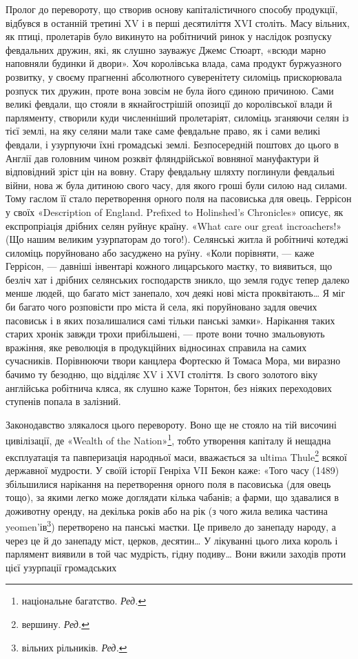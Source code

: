 Пролог до перевороту, що створив основу капіталістичного
способу продукції, відбувся в останній третині XV і в перші
десятиліття XVI століть. Масу вільних, як птиці, пролетарів
було викинуто на робітничий ринок у наслідок розпуску февдальних
дружин, які, як слушно зауважує Джемс Стюарт, «всюди
марно наповняли будинки й двори». Хоч королівська влада,
сама продукт буржуазного розвитку, у своєму прагненні абсолютного
суверенітету силоміць прискорювала розпуск тих дружин,
проте вона зовсім не була його єдиною причиною. Сами
великі февдали, що стояли в якнайгострішій опозиції до королівської
влади й парляменту, створили куди численніший пролетаріят,
силоміць зганяючи селян із тієї землі, на яку селяни
мали таке саме февдальне право, як і сами великі февдали, і
узурпуючи їхні громадські землі. Безпосередній поштовх до цього
в Англії дав головним чином розквіт фляндрійської вовняної
мануфактури й відповідний зріст цін на вовну. Стару февдальну
шляхту поглинули февдальиі війни, нова ж була дитиною свого
часу, для якого гроші були силою над силами. Тому гаслом її
стало перетворення орного поля на пасовиська для овець. Геррісон
у своїх «Description of England. Prefixed to Holinshed’s
Chronicles» описує, як експропріація дрібних селян руйнує
країну. «What care our great incroachers!» (Що нашим великим
узурпаторам до того!). Селянські житла й робітничі котеджі
силоміць поруйновано або засуджено на руїну. «Коли порівняти, —
каже Геррісон, — давніші інвентарі кожного лицарського маєтку,
то виявиться, що безліч хат і дрібних селянських господарств
зникло, що земля годує тепер далеко менше людей, що багато
міст занепало, хоч деякі нові міста проквітають\dots{} Я міг би багато
чого розповісти про міста й села, які поруйновано задля
овечих пасовиськ і в яких позалишалися самі тільки панські
замки». Нарікання таких старих хронік завжди трохи прибільшені,
— проте вони точно змальовують вражіння, яке революція
в продукційних відносинах справила на самих сучасників.
Порівнюючи твори канцлера Фортескю й Томаса Мора, ми виразно
бачимо ту безодню, що відділяє XV і XVI століття. Із свого
золотого віку англійська робітнича кляса, як слушно каже Торнтон,
без ніяких переходових ступенів попала в залізний.

Законодавство злякалося цього перевороту. Воно ще не
стояло на тій височині цивілізації, де «Wealth of the Nation»\footnote*{
національне багатство. \emph{Ред.}
},
тобто утворення капіталу й нещадна експлуатація та павперизація
народньої маси, вважається за ultima Thule\footnote*{
вершину. \emph{Ред.}
} всякої державної
мудрости. У своїй історії Генріха VII Бекон каже: «Того
часу (1489) збільшилися нарікання на перетворення орного поля
в пасовиська (для овець тощо), за якими легко може доглядати
кілька чабанів; а фарми, що здавалися в доживотну оренду, на декілька
років або на рік (з чого жила велика частина yeomen’ів\footnote*{
вільних рільників. \emph{Ред.}
})
перетворено на панські маєтки. Це привело до занепаду народу,
а через це й до занепаду міст, церков, десятин\dots{} У лікуванні
цього лиха король і парлямент виявили в той час мудрість, гідну
подиву\dots{} Вони вжили заходів проти цієї узурпації громадських
\parbreak{}  %

